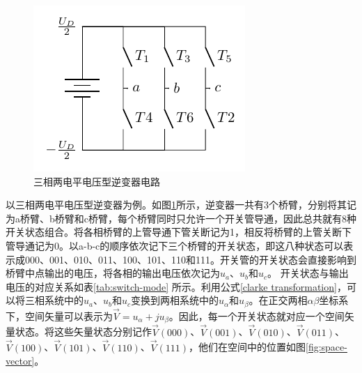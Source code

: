 \documentclass{ctexart}
\numberwithin{equation}{section}
\begin{document}
\begin{figure}[hbtp]
  \centering
  \includegraphics[width = .5\linewidth ]{three-phase-converter.pdf}
  \caption{三相两电平电压型逆变器电路}
  \label{three-phase-converter}
\end{figure}  

以三相两电平电压型逆变器为例。如图\ref{three-phase-converter}所示，逆变器一共有3个桥臂，分别将其记为a桥臂、b桥臂和c桥臂，每个桥臂同时只允许一个开关管导通，因此总共就有8种开关状态组合。将各相桥臂的上管导通下管关断记为1，相反将桥臂的上管关断下管导通记为0。以a-b-c的顺序依次记下三个桥臂的开关状态，即这八种状态可以表示成000、001、010、011、100、101、110和111。开关管的开关状态会直接影响到桥臂中点输出的电压，将各相的输出电压依次记为$u_a$、$u_b$和$u_c$。
开关状态与输出电压的对应关系如表\ref{tab:switch-mode} 所示。利用公式\ref{clarke transformation}，可以将三相系统中的$u_a$、$u_b$和$u_c$变换到两相系统中的$u_\alpha$和$u_\beta$。在正交两相$\alpha \beta$坐标系下，空间矢量可以表示为${\vec{V}=u_\alpha + ju_\beta } $。因此，每一个开关状态就对应一个空间矢量状态。将这些矢量状态分别记作$\vec V(000)$、$\vec V(001)$、$\vec V(010) $、$\vec V(011) $、$\vec V(100) $、$\vec V(101) $、$\vec V(110) $、$\vec V(111) $，他们在空间中的位置如图\ref{fig:space-vector}。
\end{document}
